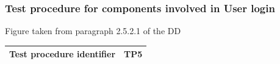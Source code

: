 \documentclass[a4paper,11pt]{report} %
\begin{document}
			\subsubsection{Test procedure for components involved in User login}
				\begin{minipage}{\linewidth}
				\end{minipage}
				\begin{center}
					Figure taken from paragraph 2.5.2.1 of the DD
				\end{center} 			
				\begin{center}
					\begin{tabular}{| l | p{10cm} |}\hline
						\textbf{Test procedure identifier} & TP5\\\hline
					\end{tabular}
				\end{center}
\end{document}
